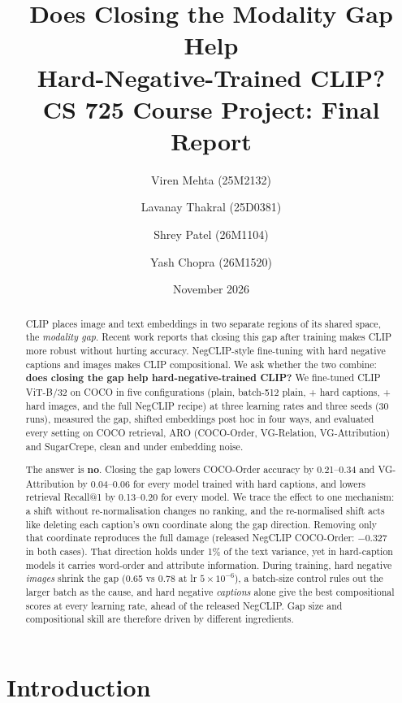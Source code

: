 \documentclass[11pt,a4paper]{article}
\title{\textbf{Does Closing the Modality Gap Help\\Hard-Negative-Trained CLIP?}\\[0.4em]
\large CS 725 Course Project: Final Report}
\author{Viren Mehta (25M2132) \and Lavanay Thakral (25D0381) \and Shrey Patel (26M1104) \and Yash Chopra (26M1520)}
\date{November 2026}
\begin{document}
\maketitle

\begin{abstract}
CLIP places image and text embeddings in two separate regions of its shared space, the
\emph{modality gap}. Recent work reports that closing this gap after training makes CLIP more robust
without hurting accuracy. NegCLIP-style fine-tuning with hard negative captions and images makes CLIP
compositional. We ask whether the two combine: \textbf{does closing the gap help hard-negative-trained
CLIP?} We fine-tuned CLIP ViT-B/32 on COCO in five configurations (plain, batch-512 plain, + hard
captions, + hard images, and the full NegCLIP recipe) at three learning rates and three seeds (30 runs),
measured the gap, shifted embeddings post hoc in four ways, and evaluated every setting on COCO
retrieval, ARO (COCO-Order, VG-Relation, VG-Attribution) and SugarCrepe, clean and under embedding
noise.

The answer is \textbf{no}. Closing the gap lowers COCO-Order accuracy by 0.21--0.34 and VG-Attribution by
0.04--0.06 for every model trained with hard captions, and lowers retrieval Recall@1 by 0.13--0.20 for
every model. We trace the effect to one mechanism: a shift without re-normalisation changes no ranking,
and the re-normalised shift acts like deleting each caption's own coordinate along the gap direction.
Removing only that coordinate reproduces the full damage (released NegCLIP COCO-Order: $-0.327$ in both
cases). That direction holds under 1\% of the text variance, yet in hard-caption models it carries
word-order and attribute information. During training, hard negative \emph{images} shrink the gap
(0.65 vs 0.78 at lr $5\times10^{-6}$), a batch-size control rules out the larger batch as the cause,
and hard negative \emph{captions} alone give the best compositional scores at every learning rate,
ahead of the released NegCLIP. Gap size and compositional skill are therefore driven by different
ingredients.
\end{abstract}

\tableofcontents
\newpage

\section{Introduction}
\end{document}
